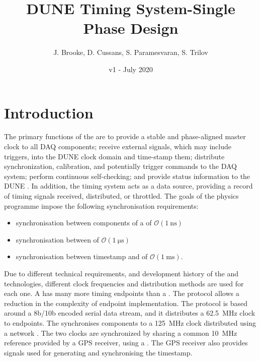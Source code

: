 \documentclass{dune}
\title{DUNE Timing System-Single Phase Design}
\author{J. Brooke, D. Cussans, S. Paramesvaran, S. Trilov}
\date{v1 - July 2020}
\begin{document}
\linenumbers
\maketitle

\tableofcontents

\section{Introduction}
\label{sec:intro}
The primary functions of the  are to provide a stable and phase-aligned master clock to all DAQ components; receive external signals, which may include triggers, into the DUNE clock domain and time-stamp them; distribute synchronization, calibration, and potentially trigger commands to the DAQ system; perform continuous self-checking; and provide status information to the DUNE . In addition, the timing system acts as a data source, providing a record of timing signals received, distributed, or throttled. The goals of the  physics programme impose the following synchronisation requirements:

\begin{itemize}
    \item synchronisation between components of a  of $\mathcal{O}(\SI{1}{\ns})$
    \item synchronisation between  of $\mathcal{O}(\SI{1}{\us})$ 
    \item synchronisation between  timestamp and  of $\mathcal{O}(\SI{1}{\ms})$.
\end{itemize}

Due to different technical requirements, and development history of the  and  technologies, different clock frequencies and distribution methods are used for each one. A  has many more timing endpoints than a . The  protocol allows a reduction in the complexity of endpoint implementation. 
 The protocol is based around a 8b/10b encoded serial data stream, and it distributes a \SI{62.5}{\MHz} clock to   endpoints. The  synchronises  components to a \SI{125}{\MHz} clock distributed using a  network \cite{wr_ohwr}. The two clocks are synchronized by sharing a common \SI{10}{\MHz} reference provided by a GPS receiver, using a . The GPS receiver also provides  signals used for generating and synchronising the  timestamp.
\end{document}
